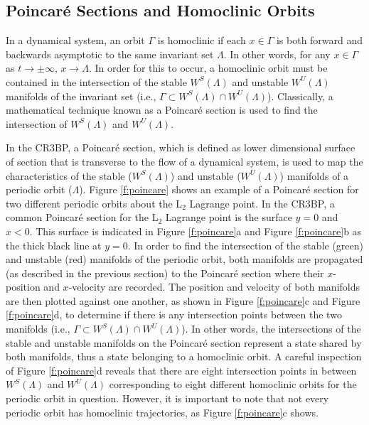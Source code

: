\documentclass[11pt]{article} %
\begin{document}
\subsection{Poincar\'{e} Sections and Homoclinic Orbits} \label{sec:HomoclinicOrbits}
In a dynamical system, an orbit $\Gamma$ is homoclinic if each $x\in\Gamma$ is both forward and backwards asymptotic to the same invariant set $\Lambda$. In other words, for any $x\in\Gamma$ as $t\rightarrow\pm\infty$, $x\rightarrow\Lambda$. In order for this to occur, a homoclinic orbit must be contained in the intersection of the stable $W^S\left(\Lambda\right)$ and unstable $W^U\left(\Lambda\right)$ manifolds of the invariant set (i.e., $\Gamma\subset W^S\left(\Lambda\right)\cap W^U\left(\Lambda\right)$). Classically, a mathematical technique known as a Poincar\'{e} section is used to find the intersection of $W^S\left(\Lambda\right)$ and $W^U\left(\Lambda\right)$. 

In the CR3BP, a Poincar\'{e} section, which is defined as lower dimensional surface of section that is transverse to the flow of a dynamical system, is used to map the characteristics of the stable ($W^S\left(\Lambda\right)$) and unstable ($W^U\left(\Lambda\right)$) manifolds of a periodic orbit ($\Lambda$). Figure \ref{f:poincare} shows an example of a Poincar\'{e} section for two different periodic orbits about the L$_2$ Lagrange point. In the CR3BP, a common Poincar\'{e} section for the L$_2$ Lagrange point is the surface $y=0$ and $x<0$. This surface is indicated in Figure \ref{f:poincare}a and Figure \ref{f:poincare}b as the thick black line at $y=0$. In order to find the intersection of the stable (green) and unstable (red) manifolds of the periodic orbit, both manifolds are propagated (as described in the previous section) to the Poincar\'{e} section where their $x$-position and $x$-velocity are recorded. The position and velocity of both manifolds are then plotted against one another, as shown in Figure \ref{f:poincare}c and Figure \ref{f:poincare}d, to determine if there is any intersection points between the two manifolds (i.e., $\Gamma\subset W^S\left(\Lambda\right)\cap W^U\left(\Lambda\right)$). In other words, the intersections of the stable and unstable manifolds on the Poincar\'{e} section represent a state shared by both manifolds, thus a state belonging to a homoclinic orbit. A careful inspection of Figure \ref{f:poincare}d reveals that there are eight intersection points in between $W^S\left(\Lambda\right)$ and $W^U\left(\Lambda\right)$ corresponding to eight different homoclinic orbits for the periodic orbit in question. However, it is important to note that not every periodic orbit has homoclinic trajectories, as Figure \ref{f:poincare}c shows. 
\end{document}
